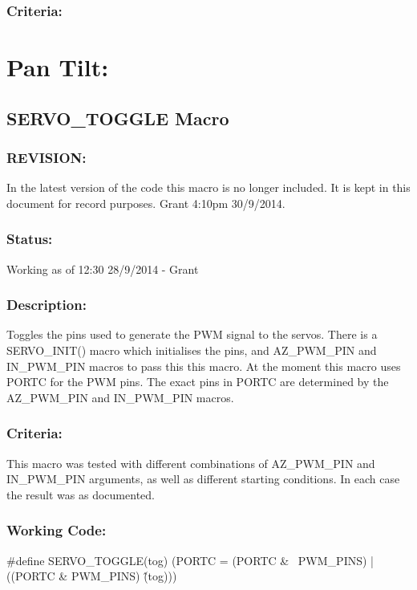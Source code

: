 \documentclass[]{report}
\begin{document}
\subsubsection{Criteria:}

\section{Pan Tilt:}

\subsection{SERVO\_TOGGLE Macro}

\subsubsection{REVISION:}
In the latest version of the code this macro is no longer included. It is kept in this document for record purposes. Grant 4:10pm 30/9/2014.

\subsubsection{Status:}
Working as of 12:30 28/9/2014 - Grant

\subsubsection{Description:}
Toggles the pins used to generate the PWM signal to the servos. There is a SERVO\_INIT() macro which initialises the pins, and AZ\_PWM\_PIN and IN\_PWM\_PIN macros to pass this this macro. At the moment this macro uses PORTC for the PWM pins. The exact pins in PORTC are determined by the AZ\_PWM\_PIN and IN\_PWM\_PIN macros.

\subsubsection{Criteria:}
This macro was tested with different combinations of AZ\_PWM\_PIN and IN\_PWM\_PIN arguments, as well as different starting conditions. In each case the result was as documented.

\subsubsection{Working Code:}
\#define SERVO\_TOGGLE(tog) (PORTC = (PORTC \& ~PWM\_PINS) | ((PORTC \& PWM\_PINS) \^ (tog)))
\end{document}
